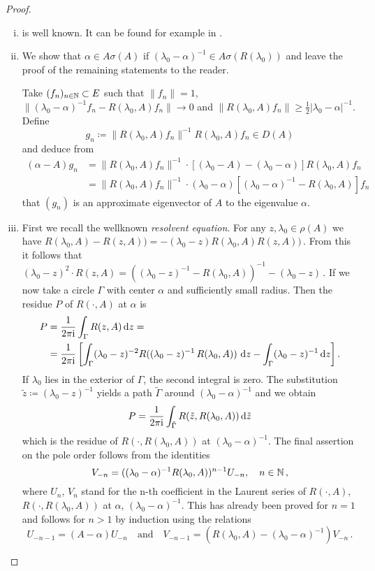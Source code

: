 \begin{proof}
\begin{enumerate}[(i), wide]
\item 
is well known. It can be found for example in \citet[VII.9.2]{dunfordschwartz:1958}.

\item 
We show that $\alpha \in A\sigma(A)$ if $(\lambda_{0}-\alpha)^{-1} \in A\sigma(R(\lambda_{0}))$ and leave the proof of the remaining statements to the reader.

Take $(f_{n})_{n \in \mathbb{N}} \subset E$ such that $\|f_{n}\| = 1$, $\|(\lambda_{0}-\alpha)^{-1}f_{n} - R(\lambda_{0},A)f_{n}\| \to 0$ and $\|R(\lambda_{0},A)f_{n}\| \geq \frac{1}{2}|\lambda_{0} - \alpha|^{-1}$.
Define
\[
g_{n} \coloneqq \|R(\lambda_{0},A)f_{n}\|^{-1}R(\lambda_{0},A)f_{n} \in D(A)
\]
and deduce from
\begin{align*}
(\alpha-A)g_{n} &= \|R(\lambda_{0},A)f_{n}\|^{-1} \cdot 
		[(\lambda_{0}-A) - (\lambda_{0}-\alpha)]R(\lambda_{0},A)f_{n} \\  
	&= \|R(\lambda_{0},A)f_{n}\|^{-1} \cdot 			(\lambda_{0}-\alpha)[(\lambda_{0}-\alpha)^{-1} - R(\lambda_{0},A)]f_{n}
\end{align*}
that $(g_{n})$ is an approximate eigenvector of $A$ to the eigenvalue $\alpha$.

\item 
First we recall the wellknown \emph{resolvent equation}. For any $z,\lambda_0 \in \rho(A)$ we have $R(\lambda_0,A) - R(z,A))= -(\lambda_0-z)R(\lambda_0,A)R(z,A))$\,. From this it follows that 
$(\lambda_0-z)^2\cdot R(z,A) = \left((\lambda_0-z)^{-1}-R(\lambda_0,A)\right)^{-1} - (\lambda_0-z)$\,.
If we now take a circle $\Gamma$ with center $\alpha$ and sufficiently small radius. 
Then the residue $P$ of $R(\cdot,A)$ at $\alpha$ is
\begin{align*}
P &=  \frac{1}{2\pi\mathrm{i} } \int_{\Gamma} R(z,A)   \mathop{}\!\mathrm{d}{z} = \\
&=  \frac{1}{2\pi\mathrm{i} } \left[\int_{\Gamma} (\lambda_{0}-z)^{-2}R((\lambda_{0}-z)^{-1}\,R(\lambda_{0},A)) \, \mathop{}\!\mathrm{d}{z}   - 
   \int_{\Gamma}(\lambda_{0}-z)^{-1} \mathop{}\!\mathrm{d}{z} \right] . 
\end{align*}
If $\lambda_{0}$ lies in the exterior of $\Gamma$, the second integral is zero.
The substitution $\tilde{z} \coloneqq (\lambda_{0} - z)^{-1}$ yields a path $\tilde{\Gamma}$ around $(\lambda_{0}-\alpha)^{-1}$ and we obtain
\[
P = \frac{1}{2\pi\mathrm{i} } \int_{\tilde{\Gamma}} R(\tilde{z},R(\lambda_{0},A)) \, \mathrm{d}\tilde{z}
\]
which is the residue of $R(\cdot,R(\lambda_{0},A))$ at $(\lambda_{0}-\alpha)^{-1}$.
The final assertion on the pole order follows from the identities
\[
V_{-n} = ((\lambda_{0}-\alpha)^{-1}R(\lambda_{0},A))^{n-1}U_{-n}, \quad n \in \mathbb{N}\,,
\]
where $U_{n}$, \resp $V_{n}$ stand for the n-th coefficient in the Laurent series of $R(\cdot,A)$, \resp $R(\cdot,R(\lambda_{0},A))$ at $\alpha$, \resp $(\lambda_{0}-\alpha)^{-1}$.
This has already been proved for $n = 1$ and follows for $n > 1$ by induction using the relations
\[
U_{-n-1} = (A - \alpha)U_{-n} \quad \text{and} \quad V_{-n-1} = \left(R(\lambda_{0},A) - (\lambda_{0}-\alpha)^{-1}\right)V_{-n}\,.
\]
\end{enumerate}
\end{proof}
